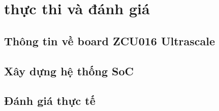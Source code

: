\clearpage
{}

\setcounter{chapter}{4}
\chapter[{THỰC THI VÀ ĐÁNH GIÁ}]{thực thi và đánh giá}
\section{Thông tin về board ZCU016 Ultrascale}
\section{Xây dựng hệ thống SoC}
\section{Đánh giá thực tế}

